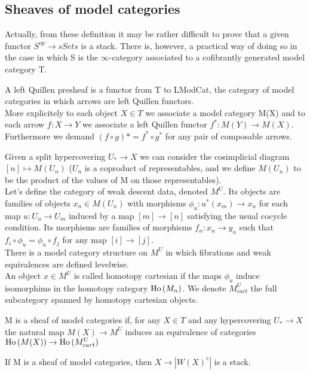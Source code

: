 \begin{refsection}
\subsection{Sheaves of model categories}

Actually, from these definition it may be rather difficult to prove that a given functor $S^{op}\to sSets$ is a stack. There is, however, a practical way of doing so
 in the case in which S is the $\infty$-category associated to a cofibrantly generated model category T.
\begin{defin}
A left Quillen presheaf is a functor from T to LModCat, the category of model categories in which arrows are left Quillen functors.\\
More explicitely to each object $X\in T$ we associate a model category M(X) and to each arrow $f:X\to Y$ we associate a left Quillen functor $f^*:M(Y)\to M(X)$.\\
Furthermore we demand $(f\circ g)*=f^*\circ g^*$ for any pair of composable arrows.
\end{defin}

Given a split hypercovering $U_*\to X$ we can consider the cosimplicial diagram $[n]\mapsto M(U_n)$ ($U_n$ is a coproduct of representables, and we define $M(U_n)$ to be
 the product of the values of M on those representables).\\
Let's define the category of weak descent data, denoted $M^U$. Its objects are families of objects $x_n\in M(U_n)$ with morphisms $\phi_u:u^*(x_m)\to x_n$ for each 
map $u:U_n\to U_m$ induced by a map $[m]\to [n]$
satisfying the usual cocycle condition. Its morphisms are families of morphisms $f_n: x_n\to y_n$ such that $f_i\circ \phi_u=\phi_u\circ f_j$ for any map $[i]\to[j]$.\\
There is a model category structure on $M^U$ in which fibrations and weak equivalences are defined levelwise.\\
An object $x\in M^U$ is called homotopy cartesian if the maps $\phi_u$ induce isomorphims in the homotopy category $\operatorname{\mathrm{Ho} \,}(M_n)$. We denote $M^U_{cart}$ the full subcategory
spanned by homotopy cartesian objects.

\begin{defin}
M is a sheaf of model categories if, for any $X\in T$ and any hypercovering $U_*\to X$ the natural map $M(X)\to M^U$ induces an equivalence of categories $\operatorname{\mathrm{Ho} \,}(M(X))\to \operatorname{\mathrm{Ho} \,}(M^U_{cart})$
\end{defin}

\begin{thm}
\label{quillen sheaf}
If M is a sheaf of model categories, then $X\to |W(X)^c|$ is a stack. 
\end{thm}



\end{refsection}
